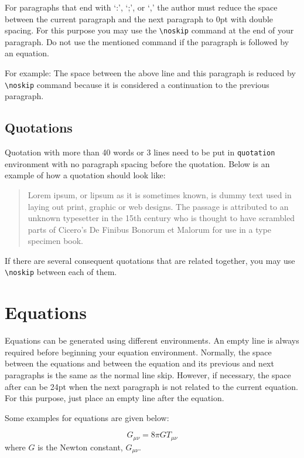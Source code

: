 \documentclass[a4paper,12pt,oneside]{report}
\begin{document}
For paragraphs that end with `:', `;', or `,' the author must reduce the space between the current paragraph and the next paragraph to 0pt with double spacing. For this purpose you may use the \texttt{\textbackslash{noskip}} command at the end of your paragraph. Do not use the mentioned command if the paragraph is followed by an equation.

For example:\noskip
The space between the above line and this paragraph is reduced by \texttt{\textbackslash{noskip}} command because it is considered a continuation to the previous paragraph.

\subsection{Quotations}\label{subsec:quotations}

Quotation with more than 40 words or 3 lines need to be put in \texttt{quotation} environment with no paragraph spacing before the quotation. Below is an example of how a quotation should look like: 

\noskip
\begin{quotation}
    Lorem ipsum, or lipsum as it is sometimes known, is dummy text used in laying out print, graphic or web designs. The passage is attributed to an unknown typesetter in the 15th century who is thought to have scrambled parts of Cicero's De Finibus Bonorum et Malorum for use in a type specimen book.
\end{quotation}

If there are several consequent quotations that are related together, you may use \texttt{\textbackslash{noskip}} between each of them.

\section{Equations}\label{sec:equations}

Equations can be generated using different environments. An empty line is always required before beginning your equation environment. Normally, the space between the equations and between the equation and its previous and next paragraphs is the same as the normal line skip. However, if necessary, the space after can be 24pt when the next paragraph is not related to the current equation. For this purpose, just place an empty line after the equation.

Some examples for equations are given below:

\begin{equation}\label{eq0}
G_{\mu \nu }=8\pi GT_{\mu \nu }
\end{equation}
where $G$ is the Newton constant, $G_{\mu \nu }$.
\end{document}
